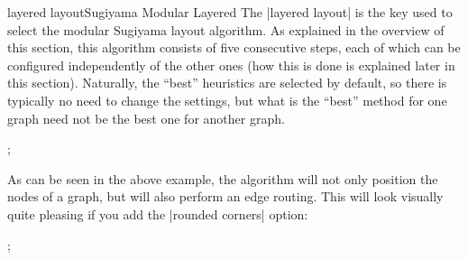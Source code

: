 \begin{gdalgorithm}{layered layout}{Sugiyama Modular Layered}
  The |layered layout| is the key used to select the modular Sugiyama
  layout algorithm. As explained in the overview of this section, this
  algorithm consists of five consecutive steps, each of which can be
  configured independently of the other ones (how this is done is
  explained later in this section). Naturally, the ``best'' heuristics
  are selected by default, so there is typically no need to change the
  settings, but what is the ``best'' method for one graph need not be
  the best one for another graph.
  
\begin{codeexample}[]
\tikz {};    
\end{codeexample}

  As can be seen in the above example, the algorithm will not only
  position the nodes of a graph, but will also perform an edge
  routing. This will look visually quite pleasing if you add the
  |rounded corners| option:

\begin{codeexample}[]
 ;    
\end{codeexample}


\end{gdalgorithm}



